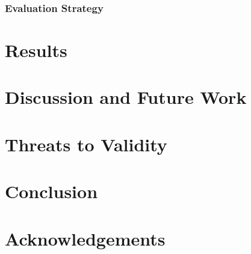 \documentclass[conference]{IEEEtran}
\begin{document}
\subsubsection{Evaluation Strategy}

\section{Results}

\section{Discussion and Future Work}

\section{Threats to Validity}

\section{Conclusion}

\section{Acknowledgements}






\end{document}
